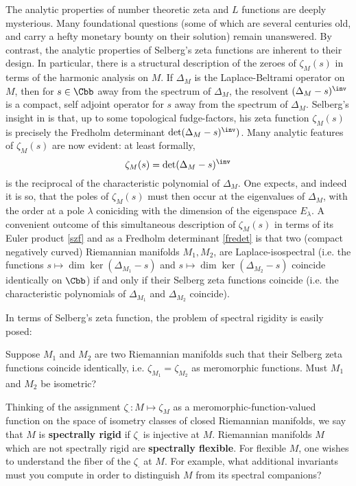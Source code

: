 \documentclass[12pt]{article}
\begin{document}
The analytic properties of number theoretic zeta and $L$ functions are deeply mysterious. Many foundational questions  (some of which are several centuries  old, and carry a hefty monetary bounty on their solution) remain unanswered.  By contrast, the analytic properties of Selberg's zeta functions are inherent to their design. In particular, there is a structural description of the zeroes of $\zeta_M(s)$  in terms of the harmonic analysis on $M$. If $\Delta_M$ is the Laplace-Beltrami operator on $M$, then for $s \in \Cbb$ away from the spectrum of $\Delta_M$, the resolvent $ (\Delta _M- s )^\inv$  is a compact, self adjoint operator for $s$ away from the spectrum of $\Delta_M$.  Selberg's insight in  \cite{selberg1956harmonic} is that, up to some topological fudge-factors,  his zeta function $\zeta_M(s)$ is precisely the Fredholm determinant $\det(\Delta_M - s)^\inv )$.  Many analytic features of $\zeta_M(s)$ are now evident: at least formally, 
		\[ \zeta_M(s) = \det(\Delta_M - s)^\inv \label{fredet} \] 
	is the reciprocal of the characteristic polynomial  of $\Delta_M$. One expects, and indeed it is so, that the poles of $\zeta_M(s)$ must then occur at the eigenvalues of  $\Delta_M$, with the order at a pole $\lambda$  coniciding with the dimension of the eigenspace $E_\lambda$.  A convenient outcome of this simultaneous description of $\zeta_M(s)$  in terms of its Euler product \ref{szf} and as a Fredholm determinant \ref{fredet}  is that two (compact negatively curved) Riemannian manifolds $M_1,M_2$, are Laplace-isospectral (i.e.  the functions $s \mapsto \dim \ker(\Delta_{M_1}  - s)$ and $s \mapsto \dim \ker(\Delta_{M_2}  - s)$ coincide identically on $\Cbb$)   if and only if their Selberg zeta functions coincide (i.e.  the characteristic polynomials of $\Delta_{M_1}$ and $\Delta_{M_2}$ coincide). 


In terms of Selberg's zeta function, the problem of spectral rigidity is easily posed: 
\begin{mdframed}
Suppose $M_1$ and $M_2$ are two Riemannian manifolds such that their Selberg zeta functions coincide identically, i.e.  $\zeta_{M_1}= \zeta_{M_2}$ as meromorphic functions.  Must $M_1$ and $M_2$ be isometric? 	
\end{mdframed}
		Thinking of the assignment $\zeta_\cdot : M \mapsto \zeta_M$ as a meromorphic-function-valued function on the space of isometry classes of closed Riemannian manifolds, we say that $M$ is {\bf spectrally rigid} if $\zeta_\cdot $ is injective at $M$.  Riemannian manifolds $M$ which are not spectrally rigid are {\bf spectrally flexible}. For flexible $M$, one wishes to understand the fiber of the $\zeta_\cdot $ at $M$. For example, what additional invariants must you compute in order to distinguish $M$ from its spectral companions?
\end{document}
